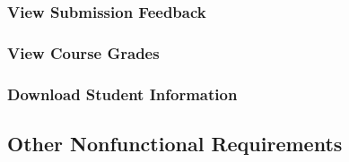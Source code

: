 \documentclass{article}
\begin{document}
\subsubsection{View Submission Feedback}

\subsubsection{View Course Grades}



\subsubsection{Download Student Information}

\subsection{Other Nonfunctional Requirements}






\end{document}
